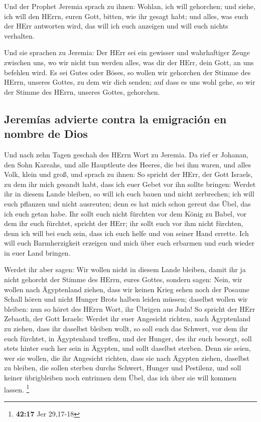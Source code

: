  Und der Prophet Jeremia sprach zu ihnen: Wohlan, ich will
gehorchen; und siehe, ich will den HErrn, euren Gott, bitten, wie ihr
gesagt habt; und alles, was euch der HErr antworten wird, das will ich
euch anzeigen und will euch nichts verhalten.

 Und sie sprachen zu Jeremia: Der HErr sei ein gewisser
und wahrhaftiger Zeuge zwischen uns, wo wir nicht tun werden alles, was
dir der HErr, dein Gott, an uns befehlen wird.  Es sei
Gutes oder Böses, so wollen wir gehorchen der Stimme des HErrn, unseres
Gottes, zu dem wir dich senden; auf dass es uns wohl gehe, so wir der
Stimme des HErrn, unseres Gottes, gehorchen.

\hypertarget{jeremuxedas-advierte-contra-la-emigraciuxf3n-en-nombre-de-dios}{%
\subsection{Jeremías advierte contra la emigración en nombre de
Dios}\label{jeremuxedas-advierte-contra-la-emigraciuxf3n-en-nombre-de-dios}}

 Und nach zehn Tagen geschah des HErrn Wort zu Jeremia.
 Da rief er Johanan, den Sohn Kareahs, und alle Hauptleute
des Heeres, die bei ihm waren, und alles Volk, klein und groß,
 und sprach zu ihnen: So spricht der HErr, der Gott
Israels, zu dem ihr mich gesandt habt, dass ich euer Gebet vor ihn
sollte bringen:  Werdet ihr in diesem Lande bleiben, so
will ich euch bauen und nicht zerbrechen; ich will euch pflanzen und
nicht ausreuten; denn es hat mich schon gereut das Übel, das ich euch
getan habe.  Ihr sollt euch nicht fürchten vor dem König
zu Babel, vor dem ihr euch fürchtet, spricht der HErr; ihr sollt euch
vor ihm nicht fürchten, denn ich will bei euch sein, dass ich euch helfe
und von seiner Hand errette.  Ich will euch
Barmherzigkeit erzeigen und mich über euch erbarmen und euch wieder in
euer Land bringen.

 Werdet ihr aber sagen: Wir wollen nicht in diesem Lande
bleiben, damit ihr ja nicht gehorcht der Stimme des HErrn, eures Gottes,
 sondern sagen: Nein, wir wollen nach Ägyptenland ziehen,
dass wir keinen Krieg sehen noch der Posaune Schall hören und nicht
Hunger Brots halben leiden müssen; daselbst wollen wir bleiben:
 nun so höret des HErrn Wort, ihr Übrigen aus Juda! So
spricht der HErr Zebaoth, der Gott Israels: Werdet ihr euer Angesicht
richten, nach Ägyptenland zu ziehen, dass ihr daselbst bleiben wollt,
 so soll euch das Schwert, vor dem ihr euch fürchtet, in
Ägyptenland treffen, und der Hunger, des ihr euch besorgt, soll stets
hinter euch her sein in Ägypten, und sollt daselbst sterben.
 Denn sie seien, wer sie wollen, die ihr Angesicht
richten, dass sie nach Ägypten ziehen, daselbst zu bleiben, die sollen
sterben durchs Schwert, Hunger und Pestilenz, und soll keiner
übrigbleiben noch entrinnen dem Übel, das ich über sie will kommen
lassen. \footnote{\textbf{42:17} Jer 29,17-18}

